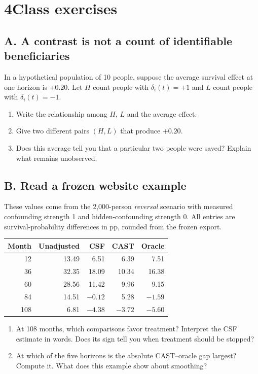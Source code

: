 \documentclass[11pt,letterpaper]{article}
\newcommand{\term}[1]{\textbf{\color{ink}#1}}
\begin{document}
\newpage
\section{4\enspace Class exercises}
\subsection{A. A contrast is not a count of identifiable beneficiaries}
In a hypothetical population of 10 people, suppose the average survival
effect at one horizon is $+0.20$. Let $H$ count people with
$\delta_i(t)=+1$ and $L$ count people with $\delta_i(t)=-1$.
\begin{enumerate}
\item Write the relationship among $H$, $L$ and the average effect.
\item Give two different pairs $(H,L)$ that produce $+0.20$.
\item Does this average tell you that a particular two people were saved?
Explain what remains unobserved.
\end{enumerate}

\subsection{B. Read a frozen website example}
These values come from the 2,000-person \emph{reversal} scenario with measured
confounding strength 1 and hidden-confounding strength 0. All entries are
survival-probability differences in pp, rounded from the frozen export.
\renewcommand{\arraystretch}{1.28}
\begin{center}
\begin{tabular}{@{}rrrrr@{}}
\toprule
\term{Month} & \term{Unadjusted} & \term{CSF} & \term{CAST} & \term{Oracle} \\
\midrule
12  & 13.49 & 6.51 & 6.39 & 7.51 \\
36  & 32.35 & 18.09 & 10.34 & 16.38 \\
60  & 28.56 & 11.42 & 9.96 & 9.15 \\
84  & 14.51 & $-0.12$ & 5.28 & $-1.59$ \\
108 & 6.81 & $-4.38$ & $-3.72$ & $-5.60$ \\
\bottomrule
\end{tabular}
\end{center}
\begin{enumerate}[resume]
\item At 108 months, which comparisons favor treatment? Interpret the CSF
estimate in words. Does its sign tell you when treatment should be stopped?
\item At which of the five horizons is the absolute CAST--oracle gap largest?
Compute it. What does this example show about smoothing?
\end{enumerate}
\end{document}
